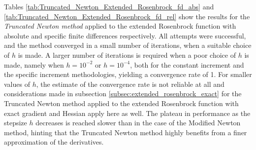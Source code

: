 Tables \ref{tab:Truncated_Newton_Extended_Rosenbrock_fd_abs} and \ref{tab:Truncated_Newton_Extended_Rosenbrock_fd_rel} show the results for the \textit{Truncated Newton method} applied to the extended Rosenbrock function with absolute and specific finite differences respectively.
All attempts were successful, and the method converged in a small number of iterations, when a suitable choice of $h$ is made.
A larger number of iterations is required when a poor choice of $h$ is made, namely when $h=10^{-2}$ or $h=10^{-4}$, both for the constant increment and the specific increment methodologies, yielding a convergence rate of 1.
For smaller values of $h$, the estimate of the convergence rate is not reliable at all and considerations made in subsection \ref{subsec:extended_rosenbrock_exact} for the Truncated Newton method applied to the extended Rosenbrock function with exact gradient and Hessian apply here as well.
The plateau in performance as the stepsize $h$ decreases is reached slower than in the case of the Modified Newton method, hinting that the Truncated Newton method highly benefits from a finer approximation of the derivatives.

